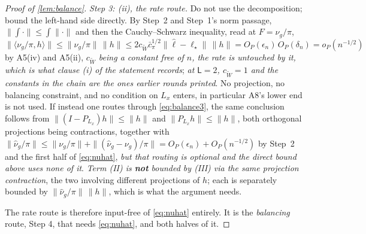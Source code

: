 \begin{proof}[Proof of \cref{lem:balance}]
\emph{Step 3: (ii), the rate route.}
Do not use the decomposition; bound the left-hand side directly. By Step~2 and Step~1's norm passage, 
$\|\int\cdot\|\le\int\|\cdot\|$ and then the Cauchy--Schwarz inequality, read at $F=\nu_g/\pi$, 
$\big\|\langle\nu_g/\pi,h\rangle\big\|\le\|\nu_g/\pi\|\,\|h\|\le2c_{\widetilde W}\bar c_\pi^{1/2}\|\hat\ell-\ell_\star\|\,\|h\|
=O_P(\epsilon_n)\,O_P(\delta_n)=o_P(n^{-1/2})$ by A5(iv) and A5(ii), \emph{$c_{\widetilde W}$ being a
constant free of $n$, the rate is untouched by it, which is what clause \textup{(i)} of the statement
records}; \emph{at $\mathsf L=2$, $c_{\widetilde W}=1$ and the constants in the chain are the ones earlier
rounds printed}. No projection, no balancing
constraint, and no condition on $L_x$ enters, in particular A8's lower end is not used. If instead
one routes through \eqref{eq:balance3}, the same conclusion follows from
$\|(I-P_{L_x})h\|\le\|h\|$ and $\|P_{L_x}h\|\le\|h\|$, both orthogonal projections being contractions,
together with $\|\hat\nu_g/\pi\|\le\|\nu_g/\pi\|+\|(\hat\nu_g-\nu_g)/\pi\|=O_P(\epsilon_n)+O_P(n^{-1/2})$
by Step~2 and the first half of \eqref{eq:nuhat}, \emph{but that routing is optional and the direct
bound above uses none of it}. \emph{Term \textup{(II)} is \textbf{not} bounded by \textup{(III)} via the
same projection contraction}, the two involving different projections of $h$; each is separately bounded
by $\|\hat\nu_g/\pi\|\,\|h\|$, which is what the argument needs.

The rate route is therefore input-free of \eqref{eq:nuhat} entirely. It is the \emph{balancing}
route, Step 4, that needs \eqref{eq:nuhat}, and both halves of it.


\end{proof}
